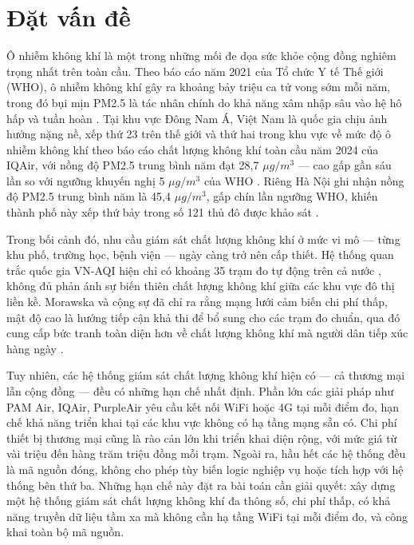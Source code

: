 \documentclass[../DoAn.tex]{subfiles}
\begin{document}
\section{Đặt vấn đề}
\label{section:1.1}

Ô nhiễm không khí là một trong những mối đe dọa sức khỏe cộng đồng nghiêm trọng nhất trên toàn cầu. Theo báo cáo năm 2021 của Tổ chức Y tế Thế giới (WHO), ô nhiễm không khí gây ra khoảng bảy triệu ca tử vong sớm mỗi năm, trong đó bụi mịn PM2.5 là tác nhân chính do khả năng xâm nhập sâu vào hệ hô hấp và tuần hoàn \cite{who2021}. Tại khu vực Đông Nam Á, Việt Nam là quốc gia chịu ảnh hưởng nặng nề, xếp thứ 23 trên thế giới và thứ hai trong khu vực về mức độ ô nhiễm không khí theo báo cáo chất lượng không khí toàn cầu năm 2024 của IQAir, với nồng độ PM2.5 trung bình năm đạt 28,7 $\mu g/m^3$ — cao gấp gần sáu lần so với ngưỡng khuyến nghị 5 $\mu g/m^3$ của WHO \cite{iqair2024report}. Riêng Hà Nội ghi nhận nồng độ PM2.5 trung bình năm là 45,4 $\mu g/m^3$, gấp chín lần ngưỡng WHO, khiến thành phố này xếp thứ bảy trong số 121 thủ đô được khảo sát \cite{iqair2024report}.

Trong bối cảnh đó, nhu cầu giám sát chất lượng không khí ở mức vi mô — từng khu phố, trường học, bệnh viện — ngày càng trở nên cấp thiết. Hệ thống quan trắc quốc gia VN-AQI hiện chỉ có khoảng 35 trạm đo tự động trên cả nước \cite{btnmt2023}, không đủ phản ánh sự biến thiên chất lượng không khí giữa các khu vực đô thị liền kề. Morawska và cộng sự đã chỉ ra rằng mạng lưới cảm biến chi phí thấp, mật độ cao là hướng tiếp cận khả thi để bổ sung cho các trạm đo chuẩn, qua đó cung cấp bức tranh toàn diện hơn về chất lượng không khí mà người dân tiếp xúc hàng ngày \cite{morawska2018}.

Tuy nhiên, các hệ thống giám sát chất lượng không khí hiện có — cả thương mại lẫn cộng đồng — đều có những hạn chế nhất định. Phần lớn các giải pháp như PAM Air, IQAir, PurpleAir yêu cầu kết nối WiFi hoặc 4G tại mỗi điểm đo, hạn chế khả năng triển khai tại các khu vực không có hạ tầng mạng sẵn có. Chi phí thiết bị thương mại cũng là rào cản lớn khi triển khai diện rộng, với mức giá từ vài triệu đến hàng trăm triệu đồng mỗi trạm. Ngoài ra, hầu hết các hệ thống đều là mã nguồn đóng, không cho phép tùy biến logic nghiệp vụ hoặc tích hợp với hệ thống bên thứ ba. Những hạn chế này đặt ra bài toán cần giải quyết: xây dựng một hệ thống giám sát chất lượng không khí đa thông số, chi phí thấp, có khả năng truyền dữ liệu tầm xa mà không cần hạ tầng WiFi tại mỗi điểm đo, và công khai toàn bộ mã nguồn.
\end{document}
